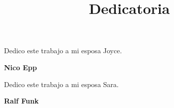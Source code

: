 \begin{dedication}
    \title{Dedicatoria}

    \begin{center}
        Dedico este trabajo a mi esposa Joyce.
    \end{center}
    \begin{flushright}
        \textbf{Nico Epp}
    \end{flushright}

    \begin{center}
        Dedico este trabajo a mi esposa Sara.
    \end{center}
    \begin{flushright}
        \textbf{Ralf Funk}
    \end{flushright}

\end{dedication}
